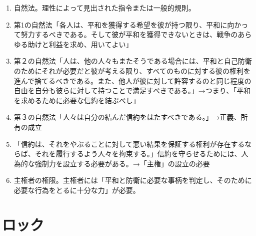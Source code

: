\documentclass[uplatex,dvipdfmx]{jsarticle} \usepackage{mystyle}%
\begin{document}
\begin{enumerate}
    \item 自然法。理性によって見出された指令または一般的規則。


    \item 第1の自然法「各人は、平和を獲得する希望を彼が持つ限り、平和に向かって努力するべきである。そして彼が平和を獲得できないときは、戦争のあらゆる助けと利益を求め、用いてよい」

    \item 第２の自然法「人は、他の人々もまたそうである場合には、平和と自己防衛のためにそれが必要だと彼が考える限り、すべてのものに対する彼の権利を進んで捨てるべきである。また、他人が彼に対して許容するのと同じ程度の自由を自分も彼らに対して持つことで満足すべきである。」→つまり、「平和を求めるために必要な信約を結ぶべし」

    \item 第３の自然法「人々は自分の結んだ信約をはたすべきである。」→正義、所有の成立


    \item 「信約は、それをやぶることに対して悪い結果を保証する権利が存在するならば、それを履行するよう人々を拘束する。」信約を守らせるためには、人為的な強制力を設立する必要がある。→「主権」の設立の必要

    \item 主権者の権限。主権者には「平和と防衛に必要な事柄を判定し、そのために必要な行為をとるに十分な力」が必要。
    
    \end{enumerate}



\section{ロック}
\end{document}
